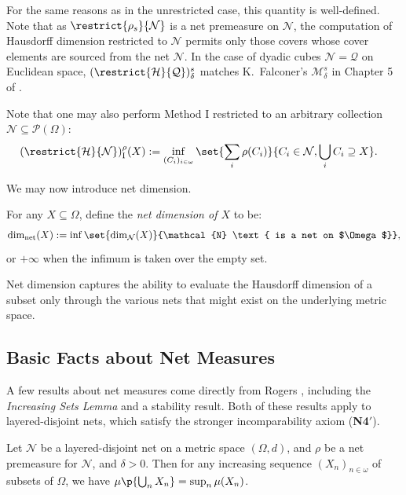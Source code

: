 For the same reasons as in the unrestricted case, this quantity is well-defined. Note that as $\restrict{\rho_s}{\mathcal{N}}$ is a net premeasure on $\mathcal{N}$, the computation of Hausdorff dimension restricted to $\mathcal{N}$ permits only those covers whose cover elements are sourced from the net $\mathcal{N}$. In the case of dyadic cubes $\mathcal{N} = \mathcal{Q}$ on Euclidean space, $(\restrict{\mathcal{H}}{\mathcal{Q}})^s_\delta$ matches K.~Falconer's $\mathscr{M}^s_\delta$ in Chapter 5 of \cite{Fal85}. 

Note that one may also perform Method I restricted to an arbitrary collection $\mathcal{N} \subseteq \mathcal{P}(\Omega)$:
\begin{align*}
    (\restrict{\mathcal{H}}{\mathcal{N}})^\rho_{\operatorname{I}}(X) &:= \inf_{(C_i)_{i \in \omega}} \set{\sum_{i} \rho(C_i)}{C_i \in \mathcal{N}, \bigcup_i C_i \supseteq X}.
\end{align*}

We may now introduce net dimension.
\begin{definition}
    For any $X \subseteq \Omega$, define the \textit{net dimension of $X$} to be:
    \begin{align*}
        \dim_{\operatorname{net}}(X) := \inf \set{\dim_{\mathcal{N}}(X)}{\mathcal{N} \text{ is a net on $\Omega$}},
    \end{align*}
    or $+\infty$ when the infimum is taken over the empty set.
\end{definition}
Net dimension captures the ability to evaluate the Hausdorff dimension of a subset only through the various nets that might exist on the underlying metric space.

\subsection{Basic Facts about Net Measures}

A few results about net measures come directly from Rogers \cite{Rog70}, including the \textit{Increasing Sets Lemma} and a stability result. Both of these results apply to layered-disjoint nets, which satisfy the stronger incomparability axiom (\textbf{N4}$'$).

\begin{theorem}
    \label{theorem:increasing_sets_lemma}
    Let $\mathcal{N}$ be a layered-disjoint net on a metric space $(\Omega, d)$, and $\rho$ be a net premeasure for $\mathcal{N}$, and $\delta > 0$. Then for any increasing sequence $(X_n)_{n \in \omega}$ of subsets of $\Omega$, we have $\mu\p{\bigcup_{n} X_n} = \sup_n \mu(X_n)$. 
\end{theorem}


